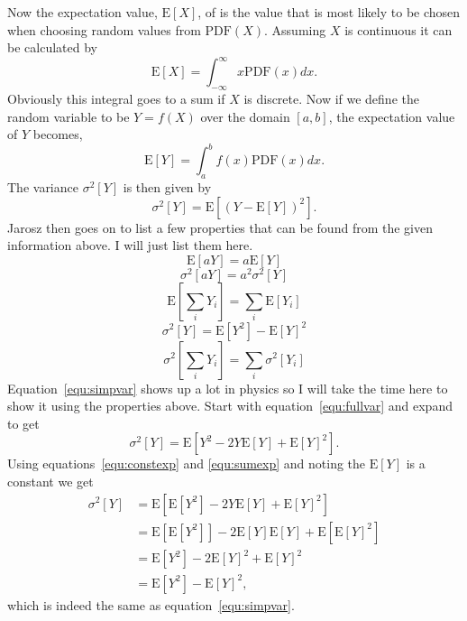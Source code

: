 \documentclass[12pt]{extarticle}
\newcommand{\PDF}{\mathrm{PDF}}
\newcommand{\Exp}{\mathrm{E}}
\begin{document}
Now the expectation value, $\Exp[X]$, of is the value that is most likely to be chosen when choosing random values from $\PDF(X)$. Assuming $X$ is continuous it can be calculated by
\begin{equation}
  \Exp[X] = \int_{-\infty}^{\infty} x \PDF(x) dx.
\end{equation}
Obviously this integral goes to a sum if $X$ is discrete. Now if we define the random variable to be $Y=f(X)$ over the domain $[a,b]$, the expectation value of $Y$ becomes,
\begin{equation}
  \Exp[Y] = \int_a^b f(x) \PDF(x) dx.
  \label{equ:fullexp}
\end{equation}
The variance $\sigma^2[Y]$ is then given by
\begin{equation}
  \sigma^2[Y] = \Exp[(Y-\Exp[Y])^2].
  \label{equ:fullvar}
\end{equation}
Jarosz then goes on to list a few properties that can be found from the given information above. I will just list them here.
\begin{equation}
  \Exp[aY] = a \Exp[Y]
  \label{equ:constexp}
\end{equation}
\begin{equation}
  \sigma^2[aY] = a^2 \sigma^2[Y]
\end{equation}
\begin{equation}
  \Exp \left[ \sum_i Y_i \right] = \sum_i \Exp[Y_i]
  \label{equ:sumexp}
\end{equation}
\begin{equation}
  \sigma^2[Y] = \Exp[Y^2] - \Exp[Y]^2
  \label{equ:simpvar}
\end{equation}
\begin{equation}
  \sigma^2 \left[ \sum_i Y_i \right] = \sum_i \sigma^2[Y_i]
\end{equation}
Equation~\ref{equ:simpvar} shows up a lot in physics so I will take the time here to show it using the properties above. Start with equation~\ref{equ:fullvar} and expand to get
\begin{equation}
  \sigma^2[Y] = \Exp[Y^2 - 2Y\Exp[Y] + \Exp[Y]^2].
\end{equation}
Using equations~\ref{equ:constexp} and \ref{equ:sumexp} and noting the $\Exp[Y]$ is a constant we get
\begin{align}
  \sigma^2[Y] &= \Exp[ \Exp[Y^2] - 2Y\Exp[Y] + \Exp[Y]^2 ] \\
  &= \Exp[\Exp[Y^2]] - 2\Exp[Y]\Exp[Y] + \Exp[\Exp[Y]^2] \\
  &= \Exp[Y^2] - 2\Exp[Y]^2 + \Exp[Y]^2 \\
  &= \Exp[Y^2] - \Exp[Y]^2,
\end{align}
which is indeed the same as equation~\ref{equ:simpvar}.
\end{document}
